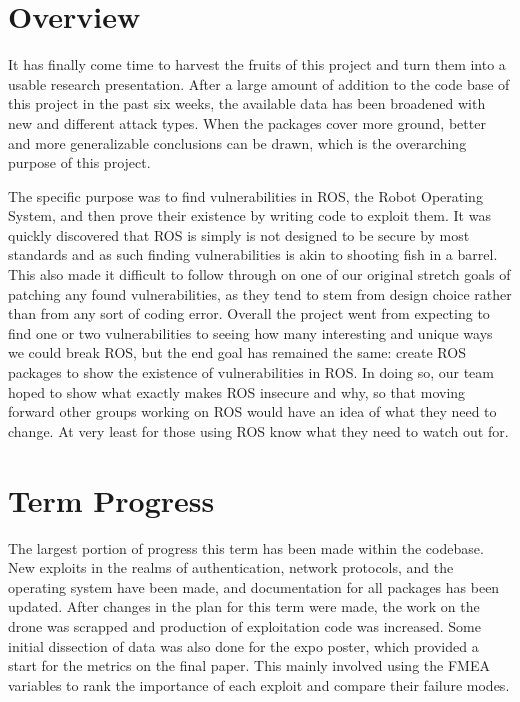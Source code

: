 \documentclass[IEEEtran,letterpaper,10pt,notitlepage,draftclsnofoot,onecolumn]{article}
\begin{document}
\newpage
{}
\tableofcontents
\clearpage

\section{Overview}
It has finally come time to harvest the fruits of this project and turn them into a usable research presentation.
After a large amount of addition to the code base of this project in the past six weeks, the available data has been broadened with new and different attack types.
When the packages cover more ground, better and more generalizable conclusions can be drawn, which is the overarching purpose of this project.

The specific purpose was to find vulnerabilities in ROS, the Robot Operating System, and then prove their existence by writing code to exploit them.
It was quickly discovered that ROS is simply is not designed to be secure by most standards and as such finding vulnerabilities is akin to shooting fish in a barrel.
This also made it difficult to follow through on one of our original stretch goals of patching any found vulnerabilities, as they tend to stem from design choice rather than from any sort of coding error.
Overall the project went from expecting to find one or two vulnerabilities to seeing how many interesting and unique ways we could break ROS, but the end goal has remained the same: create ROS packages to show the existence of vulnerabilities in ROS.
In doing so, our team hoped to show what exactly makes ROS insecure and why, so that moving forward other groups working on ROS would have an idea of what they need to change.
At very least for those using ROS know what they need to watch out for.

\section{Term Progress}
The largest portion of progress this term has been made within the codebase.
New exploits in the realms of authentication, network protocols, and the operating system have been made, and documentation for all packages has been updated.
After changes in the plan for this term were made, the work on the drone was scrapped and production of exploitation code was increased.
Some initial dissection of data was also done for the expo poster, which provided a start for the metrics on the final paper.
This mainly involved using the FMEA variables to rank the importance of each exploit and compare their failure modes.
\end{document}
